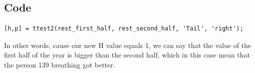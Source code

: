 \documentclass{article}
\begin{document}
\subsection{Code}
\begin{tcolorbox}
\begin{verbatim}
[h,p] = ttest2(rest_first_half, rest_second_half, 'Tail', 'right');
\end{verbatim}
\end{tcolorbox}
In other words, cause our new H value equals 1, we can say that the value of the first half of the year is bigger than the second half, which in this case mean that the person 139 breathing got better. 
\end{document}
